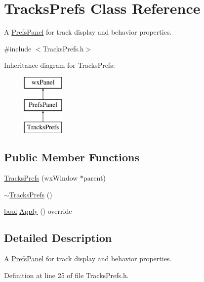 \hypertarget{class_tracks_prefs}{}\section{Tracks\+Prefs Class Reference}
\label{class_tracks_prefs}


A \hyperlink{class_prefs_panel}{Prefs\+Panel} for track display and behavior properties.  




{\ttfamily \#include $<$Tracks\+Prefs.\+h$>$}

Inheritance diagram for Tracks\+Prefs\+:\begin{figure}[H]
\begin{center}
\leavevmode
\includegraphics[height=3.000000cm]{class_tracks_prefs}
\end{center}
\end{figure}
\subsection*{Public Member Functions}
\begin{DoxyCompactItemize}
\item 
\hyperlink{class_tracks_prefs_ac7354bb537c7d5c1693e446753fce65b}{Tracks\+Prefs} (wx\+Window $\ast$parent)
\item 
\hyperlink{class_tracks_prefs_af6c77323dcf457a6bc2a867e7a3b9ed5}{$\sim$\+Tracks\+Prefs} ()
\item 
\hyperlink{mac_2config_2i386_2lib-src_2libsoxr_2soxr-config_8h_abb452686968e48b67397da5f97445f5b}{bool} \hyperlink{class_tracks_prefs_a149776163f75715b9dc091324f85225a}{Apply} () override
\end{DoxyCompactItemize}


\subsection{Detailed Description}
A \hyperlink{class_prefs_panel}{Prefs\+Panel} for track display and behavior properties. 

Definition at line 25 of file Tracks\+Prefs.\+h.



